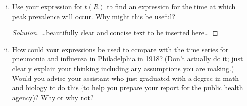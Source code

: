\documentclass[12pt]{article}
\begin{document}
\begin{enumerate}[(a)]
\begin{enumerate}[(i)]
{\begin{proof}[Solution]
{	\begin{align}
		\frac{dS}{dR} &= \frac{dS}{dt} \frac{dt}{dR} \\
				     &= -\R_0 S \\
		\int_{S_0}^{S} \frac{dS'}{S'} &= -\R_0 \int_{0}^{R} dR' \\
		\ln{\frac{S}{S_0}} &= -\R_0 R \\
		S &= S_0 e^{-\R_0 R} = 1 - R - \frac{dR}{dt} \\
		\frac{dR}{dt} &= 1 - R - S_0 e^{-\R_0 R} \\
		\int_{0}^{t} dt = t(R) &= \int_{0}^{R} \frac{dR'}{1 - R' - S_0 e^{-\R_0 R'}}
	\end{align}

}
\end{proof}
}

\item Use your expression for $t(R)$ to find an expression for the time at which peak prevalence will occur.  Why might this be useful?

{\color{blue}
\begin{proof}[Solution]
{\color{magenta}\dots beautifully clear and concise text to be inserted here\dots}
\end{proof}
}

\item How could your expressions be used to compare with the time series for pneumonia and influenza in Philadelphia in 1918?  (Don't actually do it; just clearly explain your thinking including any assumptions you are making.)  Would you advise your assistant who just graduated with a degree in math and biology to do this (to help you prepare your report for the public health agency)?  Why or why not?


\end{enumerate}
\end{enumerate}
\end{document}
